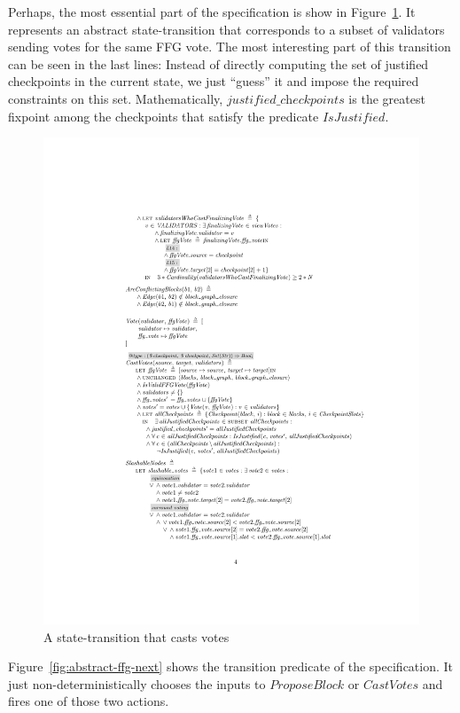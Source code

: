 Perhaps, the most essential part of the specification is show in
Figure~\ref{fig:abstract-ffg-cast-votes}. It represents an abstract
state-transition that corresponds to a subset of validators sending votes for
the same FFG vote. The most interesting part of this transition can be seen in
the last lines: Instead of directly computing the set of justified checkpoints
in the current state, we just ``guess'' it and impose the required constraints
on this set. Mathematically, $\textit{justified\_checkpoints}$ is the greatest
fixpoint among the checkpoints that satisfy the predicate
$\textit{IsJustified}$.


\begin{figure}
    \centering
    \includegraphics[width=\textwidth]{images/abstract-ffg-cast-votes.pdf}  %
    \caption{A state-transition that casts votes}\label{fig:abstract-ffg-cast-votes}
\end{figure}

Figure~\ref{fig:abstract-ffg-next} shows the transition predicate of the
specification. It just non-deterministically chooses the inputs to
$\textit{ProposeBlock}$ or $\textit{CastVotes}$ and fires one of those two
actions.


